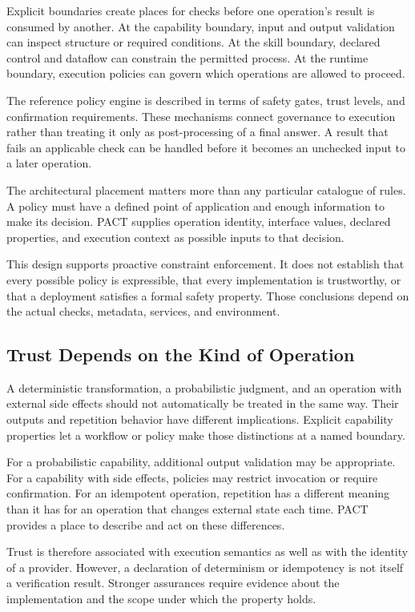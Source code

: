 \documentclass[10pt,twocolumn,a4paper]{article}
\begin{document}
Explicit boundaries create places for checks before one operation's result is consumed by another. At the capability boundary, input and output validation can inspect structure or required conditions. At the skill boundary, declared control and dataflow can constrain the permitted process. At the runtime boundary, execution policies can govern which operations are allowed to proceed.


The reference policy engine is described in terms of safety gates, trust levels, and confirmation requirements. These mechanisms connect governance to execution rather than treating it only as post-processing of a final answer. A result that fails an applicable check can be handled before it becomes an unchecked input to a later operation.


The architectural placement matters more than any particular catalogue of rules. A policy must have a defined point of application and enough information to make its decision. PACT supplies operation identity, interface values, declared properties, and execution context as possible inputs to that decision.


This design supports proactive constraint enforcement. It does not establish that every possible policy is expressible, that every implementation is trustworthy, or that a deployment satisfies a formal safety property. Those conclusions depend on the actual checks, metadata, services, and environment.


\subsection{Trust Depends on the Kind of Operation}

A deterministic transformation, a probabilistic judgment, and an operation with external side effects should not automatically be treated in the same way. Their outputs and repetition behavior have different implications. Explicit capability properties let a workflow or policy make those distinctions at a named boundary.


For a probabilistic capability, additional output validation may be appropriate. For a capability with side effects, policies may restrict invocation or require confirmation. For an idempotent operation, repetition has a different meaning than it has for an operation that changes external state each time. PACT provides a place to describe and act on these differences.


Trust is therefore associated with execution semantics as well as with the identity of a provider. However, a declaration of determinism or idempotency is not itself a verification result. Stronger assurances require evidence about the implementation and the scope under which the property holds.
\end{document}
